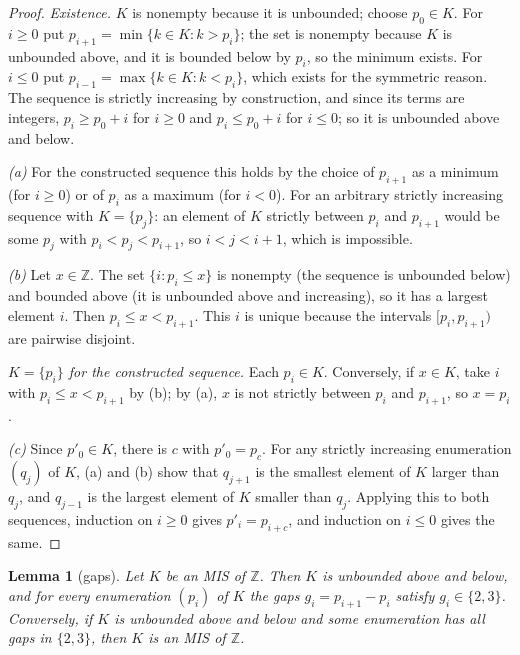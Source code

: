 \documentclass[11pt]{article}
\theoremstyle{plain}
\newtheorem{lemma}[lemma]{Lemma}
\theoremstyle{definition}
\theoremstyle{remark}
\newcommand{\Z}{\mathbb{Z}}
\begin{document}
\begin{proof}
\emph{Existence.} $K$ is nonempty because it is unbounded; choose $p_0 \in K$. For $i \ge 0$
put $p_{i+1} = \min\{k \in K : k > p_i\}$; the set is nonempty because $K$ is unbounded
above, and it is bounded below by $p_i$, so the minimum exists. For $i \le 0$ put
$p_{i-1} = \max\{k \in K : k < p_i\}$, which exists for the symmetric reason. The sequence is
strictly increasing by construction, and since its terms are integers, $p_i \ge p_0 + i$ for
$i \ge 0$ and $p_i \le p_0 + i$ for $i \le 0$; so it is unbounded above and below.

\emph{(a)} For the constructed sequence this holds by the choice of $p_{i+1}$ as a minimum
(for $i \ge 0$) or of $p_i$ as a maximum (for $i < 0$). For an arbitrary strictly increasing
sequence with $K = \{p_j\}$: an element of $K$ strictly between $p_i$ and $p_{i+1}$ would be
some $p_j$ with $p_i < p_j < p_{i+1}$, so $i < j < i+1$, which is impossible.

\emph{(b)} Let $x \in \Z$. The set $\{i : p_i \le x\}$ is nonempty (the sequence is unbounded
below) and bounded above (it is unbounded above and increasing), so it has a largest element
$i$. Then $p_i \le x < p_{i+1}$. This $i$ is unique because the intervals
$[p_i, p_{i+1})$ are pairwise disjoint.

\emph{$K = \{p_i\}$ for the constructed sequence.} Each $p_i \in K$. Conversely, if $x \in K$,
take $i$ with $p_i \le x < p_{i+1}$ by (b); by (a), $x$ is not strictly between $p_i$ and
$p_{i+1}$, so $x = p_i$.

\emph{(c)} Since $p'_0 \in K$, there is $c$ with $p'_0 = p_c$. For any strictly increasing
enumeration $(q_j)$ of $K$, (a) and (b) show that $q_{j+1}$ is the smallest element of $K$
larger than $q_j$, and $q_{j-1}$ is the largest element of $K$ smaller than $q_j$. Applying
this to both sequences, induction on $i \ge 0$ gives $p'_{i} = p_{i+c}$, and induction on
$i \le 0$ gives the same.
\end{proof}

\begin{lemma}[gaps]\label{lem:gaps}
Let $K$ be an MIS of $\Z$. Then $K$ is unbounded above and below, and for every enumeration
$(p_i)$ of $K$ the \emph{gaps} $g_i = p_{i+1} - p_i$ satisfy $g_i \in \{2, 3\}$. Conversely,
if $K$ is unbounded above and below and some enumeration has all gaps in $\{2,3\}$, then $K$
is an MIS of $\Z$.
\end{lemma}
\end{document}
